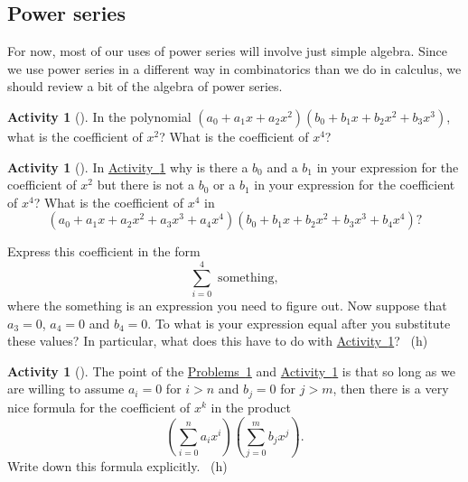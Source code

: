 \documentclass[10pt,]{book}
\theoremstyle{plain}
\theoremstyle{definition}
\theoremstyle{definition}
\theoremstyle{definition}
\newtheorem{activity}[project]{Activity}
\numberwithin{equation}{chapter}
\begin{document}
\subsection[{Power series}]{Power series}\label{subsection-33}
\hypertarget{p-1282}{}%
For now, most of our uses of power series will involve just simple algebra. Since we use power series in a different way in combinatorics than we do in calculus, we should review a bit of the algebra of power series.%
\begin{activity}[]\label{coeffinproduct}
\hypertarget{p-1283}{}%
In the polynomial \((a_0 +a_1x+a_2x^2)(b_0+b_1x+b_2x^2+b_3x^3)\), what is the coefficient of \(x^2\)? What is the coefficient of \(x^4\)?%
\end{activity}
\begin{activity}[]\label{coeffinproduct1}
\hypertarget{p-1285}{}%
In \hyperref[coeffinproduct]{Activity~\ref{coeffinproduct}} why is there a \(b_0\) and a \(b_1\) in your expression for the coefficient of \(x^2\) but there is not a \(b_0\) or a \(b_1\) in your expression for the coefficient of \(x^4\)? What is the coefficient of \(x^4\) in%
\begin{equation*}
(a_0+a_1x+a_2x^2+a_3x^3+a_4x^4)(b_0+b_1x+b_2x^2
+b_3x^3+b_4x^4)?
\end{equation*}
%
\par
\hypertarget{p-1286}{}%
Express this coefficient in the form%
\begin{equation*}
\sum_{i=0}^4 \mbox{ something} ,
\end{equation*}
where the something is an expression you need to figure out. Now suppose that \(a_3=0\), \(a_4=0\) and \(b_4=0\). To what is your expression equal after you substitute these values? In particular, what does this have to do with \hyperref[coeffinproduct]{Activity~\ref{coeffinproduct}}?%
~{\tiny (h)}\end{activity}
\begin{activity}[]\label{coeffinproduct2}
\hypertarget{p-1290}{}%
The point of the \hyperref[coeffinproduct]{Problems~\ref{coeffinproduct}} and \hyperref[coeffinproduct1]{Activity~\ref{coeffinproduct1}} is that so long as we are willing to assume \(a_i=0\) for \(i>n\) and \(b_j =0\) for \(j>m\), then there is a very nice formula for the coefficient of \(x^k\) in the product%
\begin{equation*}
\left(\sum_{i=0}^n a_ix^i\right)\left(\sum_{j=0}^m b_jx^j\right).
\end{equation*}
Write down this formula explicitly.%
~{\tiny (h)}\end{activity}
\end{document}

